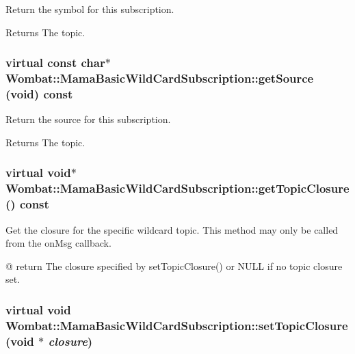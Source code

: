 Return the symbol for this subscription. \begin{DoxyReturn}{Returns}
The topic. 
\end{DoxyReturn}
\hypertarget{classWombat_1_1MamaBasicWildCardSubscription_a8e9611d5a76d36c1c67c2158f89273e8}{
\subsubsection[{getSource}]{\setlength{\rightskip}{0pt plus 5cm}virtual const char$\ast$ Wombat::MamaBasicWildCardSubscription::getSource (void) const}}
\label{classWombat_1_1MamaBasicWildCardSubscription_a8e9611d5a76d36c1c67c2158f89273e8}


Return the source for this subscription. \begin{DoxyReturn}{Returns}
The topic. 
\end{DoxyReturn}
\hypertarget{classWombat_1_1MamaBasicWildCardSubscription_abe5fcf14f1a436a58da30c79a825aa63}{
\subsubsection[{getTopicClosure}]{\setlength{\rightskip}{0pt plus 5cm}virtual void$\ast$ Wombat::MamaBasicWildCardSubscription::getTopicClosure () const}}
\label{classWombat_1_1MamaBasicWildCardSubscription_abe5fcf14f1a436a58da30c79a825aa63}


Get the closure for the specific wildcard topic. This method may only be called from the onMsg callback.

@ return The closure specified by setTopicClosure() or NULL if no topic closure set. \hypertarget{classWombat_1_1MamaBasicWildCardSubscription_af039fe8b841712d13e0740589c9cba45}{
\subsubsection[{setTopicClosure}]{\setlength{\rightskip}{0pt plus 5cm}virtual void Wombat::MamaBasicWildCardSubscription::setTopicClosure (void $\ast$ {\em closure})}}
\label{classWombat_1_1MamaBasicWildCardSubscription_af039fe8b841712d13e0740589c9cba45}


